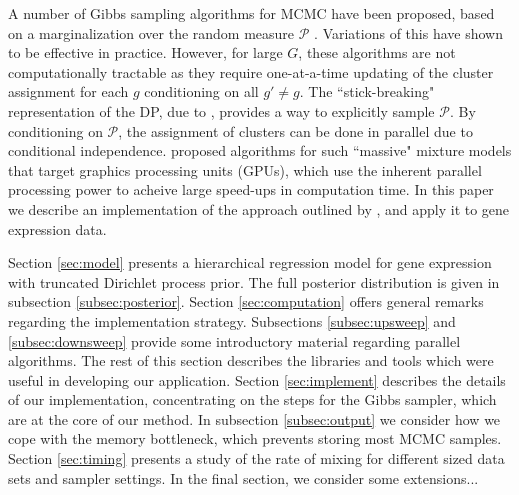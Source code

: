 A number of Gibbs sampling algorithms for MCMC have been proposed, based on a marginalization over the random measure $\mathcal{P}$ \citep{neal2000}. Variations of this have shown to be effective in practice. However, for large $G$, these algorithms are not computationally tractable as they require one-at-a-time updating of the cluster assignment for each $g$ conditioning on all $g'\neq g$. The ``stick-breaking" representation of the DP, due to \citet{sethuraman}, provides a way to explicitly sample $\mathcal{P}$. By conditioning on $\mathcal{P}$, the assignment of clusters can be done in parallel due to conditional independence. \citet{suchard} proposed algorithms for such ``massive" mixture models that target graphics processing units (GPUs), which use the inherent parallel processing power to acheive large speed-ups in computation time. In this paper we describe an implementation of the approach outlined by \citet{suchard}, and apply it to gene expression data.

Section \ref{sec:model} presents a hierarchical regression model for gene expression with truncated Dirichlet process prior. The full posterior distribution is given in subsection \ref{subsec:posterior}. Section \ref{sec:computation} offers general remarks regarding the implementation strategy. Subsections \ref{subsec:upsweep} and \ref{subsec:downsweep} provide some introductory material regarding parallel algorithms. The rest of this section describes the libraries and tools which were useful in developing our application. Section \ref{sec:implement} describes the details of our implementation, concentrating on the steps for the Gibbs sampler, which are at the core of our method. In subsection \ref{subsec:output} we consider how we cope with the memory bottleneck, which prevents storing most MCMC samples. Section \ref{sec:timing} presents a study of the rate of mixing for different sized data sets and sampler settings. In the final section, we consider some extensions...

